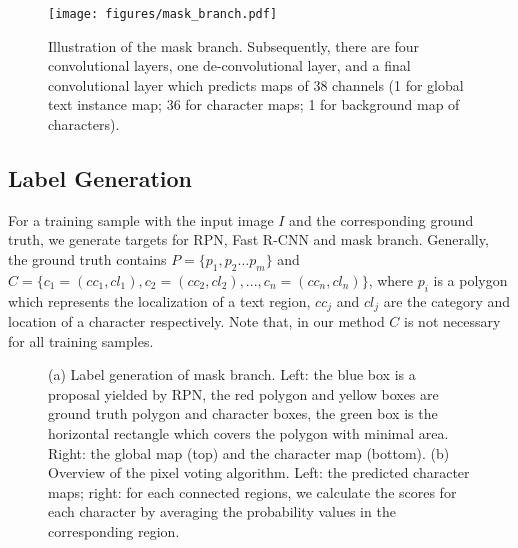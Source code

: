 \documentclass[runningheads]{llncs}
\begin{document}
\begin{figure}[!b]
\begin{center}
\texttt{[image: figures/mask\_branch.pdf]}
\end{center}
\caption{Illustration of the mask branch. Subsequently, there are four convolutional layers, one de-convolutional layer, and a final convolutional layer which predicts maps of 38 channels (1 for global text instance map; 36 for character maps; 1 for background map of characters).}
\label{fig:mask_branch}
\end{figure}

\subsection{Label Generation}
For a training sample with the input image $I$ and the corresponding ground truth,  we generate targets for RPN, Fast R-CNN and mask branch. Generally, the ground truth contains $P=\{p_{1}, p_{2}...p_{m} \}$ and $C=\{c_{1}=(cc_{1},cl_{1}),c_{2}=(cc_{2},cl_{2}), ... , c_{n}=(cc_{n},cl_{n})\}$, where $p_{i}$ is a polygon which represents the localization of a text region, $cc_{j}$ and $cl_{j}$ are the category and location of a character respectively. Note that, in our method $C$ is not necessary for all training samples. 



\begin{figure}[!b]
\begin{center}
\captionsetup[subfigure]{justification=centering}
    \centering
{}
\end{center}
 \caption{(a) Label generation of mask branch. Left: the blue box is a proposal yielded by RPN, the red polygon and yellow boxes are ground truth polygon and character boxes, the green box is the horizontal rectangle which covers the polygon with minimal area. Right: the global map (top) and the character map (bottom). (b) Overview of the pixel voting algorithm. Left: the predicted character maps; right: for each connected regions, we calculate the scores for each character by averaging the probability values in the corresponding region.}
\label{fig:denser-box}
\end{figure}
\end{document}

